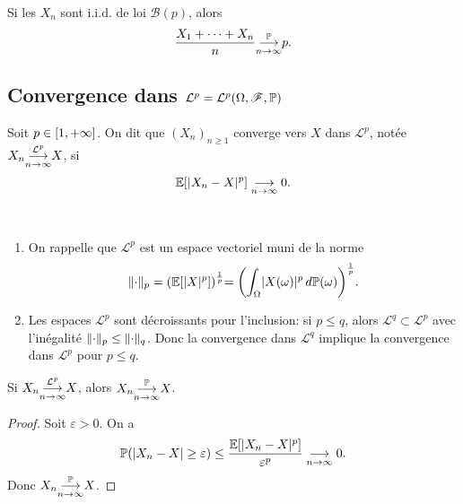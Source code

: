 \begin{example}
    Si les \(X_n\) sont i.i.d. de loi \(\mathcal B(p)\), alors
    \begin{equation*}
        \frac{X_1 + \cdots + X_n}{n} \underset{n\to\infty}{{\overset{\mathbb{P}}{\longrightarrow}}} p.
    \end{equation*}
\end{example}

\subsection{Convergence dans \(\mathcal L^p = \mathcal L^p(\Omega, \mathscr{F}, \mathbb{P})\)} %

\begin{definition}
    Soit \(p \in \mathopen{}\left[1, +\infty\right]\mathclose{}\). On dit que \({(X_n)}_{n\geq 1}\)
    converge vers \(X\) dans \(\mathcal L^p\), notée \(X_n \underset{n\to\infty}{{\overset{\mathcal{L}^{p}}{\longrightarrow}}} X\),
    si
    \begin{equation*}
        \mathbb{E}[\mathopen{}\left|X_n - X\right|\mathclose{}^p] \underset{n\to\infty}{\longrightarrow} 0.
    \end{equation*}
\end{definition}

\begin{remark}\,\\
    \begin{enumerate}
        \item 
        On rappelle que \(\mathcal L^p\) est un espace vectoriel
        muni de la norme
        \begin{equation*}
            \mathopen{}\left\|\cdot\right\|\mathclose{}_p = {\left(\mathbb{E}[\mathopen{}\left|X\right|\mathclose{}^p]\right)}^{\frac{1}{p}}
            {=\left(\int_\Omega \mathopen{}\left|X(\omega)\right|\mathclose{}^p \mathop{}\!{d} \mathbb{P}(\omega)\right)}^{\frac{1}{p}}.
        \end{equation*}

        \item Les espaces \(\mathcal L^p\) sont décroissants
        pour l'inclusion: si \(p \leq q\), alors \(\mathcal L^q \subset \mathcal L^p\)
        avec l'inégalité \(\mathopen{}\left\|\cdot\right\|\mathclose{}_p \leq \mathopen{}\left\|\cdot\right\|\mathclose{}_q\).
        Donc la convergence dans \(\mathcal L^q\) implique la
        convergence dans \(\mathcal L^p\) pour \(p \leq q\).
    \end{enumerate}
\end{remark}

\begin{proposition}
    Si \(X_n \underset{n\to\infty}{{\overset{\mathcal{L}^{p}}{\longrightarrow}}} X\), alors \(X_n \underset{n\to\infty}{{\overset{\mathbb{P}}{\longrightarrow}}} X\).
\end{proposition}

\begin{proof}
    Soit \(\varepsilon > 0\). On a
    \begin{equation*}
        \mathbb{P}(\mathopen{}\left|X_n - X\right|\mathclose{} \geq \varepsilon)
        \leq \frac{\mathbb{E}[\mathopen{}\left|X_n - X\right|\mathclose{}^p]}{\varepsilon^p} \underset{n\to\infty}{\longrightarrow} 0.
    \end{equation*}
    Donc \(X_n \underset{n\to\infty}{{\overset{\mathbb{P}}{\longrightarrow}}} X\).
\end{proof}

